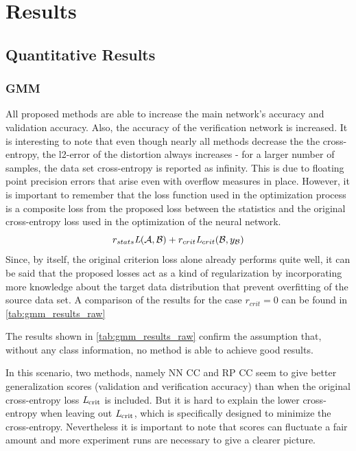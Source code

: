\section{Results}

\subsection{Quantitative Results}

\subsubsection{GMM}

All proposed methods are able to increase the main network's accuracy and validation accuracy.
Also, the accuracy of the verification network is increased.
It is interesting to note that even though nearly all methods decrease the 
the cross-entropy, the l2-error of the distortion always increases
- for a larger number of samples, the data set cross-entropy is reported as infinity.
This is due to floating point precision errors that arise even with overflow measures in place.
However, it is important to remember that the loss function used in the optimization process
is a composite loss from the proposed loss between the statistics
and the original cross-entropy loss used in the optimization of the neural network.
\[
    r_{stats} \textit{L}(\mathcal A, \mathcal B) + r_{crit}\textit{L}_{crit}(\mathcal B, y_{\mathcal B})
\]
Since, by itself, the original criterion loss alone already performs quite well, 
it can be said that the proposed losses act as a kind of regularization 
by incorporating more knowledge about the target data distribution that prevent overfitting
of the source data set.
A comparison of the results for the case $r_{crit}=0$ can be found in \cref{tab:gmm_results_raw}

The results shown in \cref{tab:gmm_results_raw} confirm the assumption that,
without any class information, no method is able to achieve good results.

In this scenario, two methods, namely NN CC and RP CC seem to give 
better generalization scores 
(validation and verification accuracy) than when the original cross-entropy loss 
$\textit{L}_\text{crit}$ is included.
But it is hard to explain the lower cross-entropy when leaving out 
$\textit{L}_\text{crit}$, which is specifically designed to minimize the cross-entropy.
Nevertheless it is important to note that scores can fluctuate a fair amount and more 
experiment runs are necessary to give a clearer picture.

